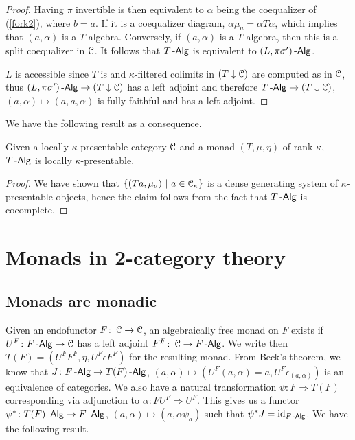 \documentclass[a4paper,11pt,oneside,openany]{scrbook}
\begin{document}
\begin{proof}
	Having $\pi$ invertible is then equivalent to $\alpha$ being the coequalizer of (\ref{fork2}), where $b=a$. If it is a coequalizer diagram, $\alpha\mu_a=\alpha T\alpha$, which implies that $(a,\alpha)$ is a $T$-algebra. Conversely, if $(a,\alpha)$ is a $T$-algebra, then this is a split coequalizer in $\operatorname{\mathcal{C}}$. It follows that $T\operatorname{-\mathsf{Alg}}$ is equivalent to $(L,\pi\sigma')\operatorname{-\mathsf{Alg}}$.

	$L$ is accessible since $T$ is and $\kappa$-filtered colimits in $(T\downarrow\operatorname{\mathcal{C}})$ are computed as in $\operatorname{\mathcal{C}}$, thus $(L,\pi\sigma')\operatorname{-\mathsf{Alg}}\rightarrow(T\downarrow\operatorname{\mathcal{C}})$ has a left adjoint and therefore $T\operatorname{-\mathsf{Alg}}\rightarrow (T\downarrow\operatorname{\mathcal{C}})$, $(a,\alpha)\mapsto(a,a,\alpha)$ is fully faithful and has a left adjoint.
\end{proof}

We have the following result as a consequence.

\begin{thm}
	Given a locally $\kappa$-presentable category $\operatorname{\mathcal{C}}$ and a monad $(T,\mu,\eta)$ of rank $\kappa$, $T\operatorname{-\mathsf{Alg}}$ is locally $\kappa$-presentable.
\end{thm}

\begin{proof}
	We have shown that $\{(Ta,\mu_a)\ |\ a\in\operatorname{\mathcal{C}}_\kappa\}$ is a dense generating system of $\kappa$-presentable objects, hence the claim follows from the fact that $T\operatorname{-\mathsf{Alg}}$ is cocomplete.
\end{proof}

\chapter{Monads in 2-category theory}

\section{Monads are monadic}

Given an endofunctor $F\colon\operatorname{\mathcal{C}}\rightarrow\operatorname{\mathcal{C}}$, an algebraically free monad on $F$ exists if $U^F\colon F\operatorname{-\mathsf{Alg}}\rightarrow\operatorname{\mathcal{C}}$ has a left adjoint $F^F\colon\operatorname{\mathcal{C}}\rightarrow F\operatorname{-\mathsf{Alg}}$. We write then $T(F)=(U^FF^F,\eta,U^F\epsilon F^F)$ for the resulting monad. From Beck's theorem, we know that $J\colon F\operatorname{-\mathsf{Alg}}\rightarrow T(F)\operatorname{-\mathsf{Alg}}$, $(a,\alpha)\mapsto (U^F(a,\alpha)=a,U^F\epsilon_{(a,\alpha)})$ is an equivalence of categories. We also have a natural transformation $\psi\colon F\Rightarrow T(F)$ corresponding via adjunction to $\alpha\colon FU^F\Rightarrow U^F$. This gives us a functor $\psi^*\colon T(F)\operatorname{-\mathsf{Alg}}\rightarrow F\operatorname{-\mathsf{Alg}}$, $(a,\alpha)\mapsto (a,\alpha\psi_a)$ such that $\psi^* J=\operatorname{id}_{F\operatorname{-\mathsf{Alg}}}$. We have the following result.
\end{document}
